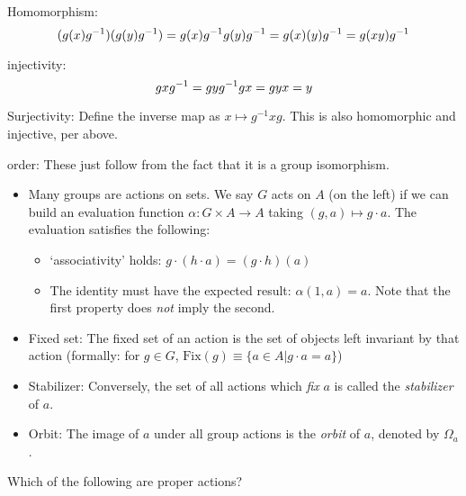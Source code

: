 \documentclass[1    0pt, answers]{exam} \renewcommand{\baselinestretch}{1.05}
\theoremstyle{plain}
\theoremstyle{definition}
\begin{document}
\begin{questions}
\begin{solution}
Homomorphism:
\[
(g (x) g^{-1}) (g (y) g^{-1})\\
= g (x) g^{-1} g (y) g^{-1}\\
= g (x) (y) g^{-1}\\
= g (xy) g^{-1}
\]

injectivity:
\[
g x g^{-1} = g y g^{-1}\\
g x = g y\\
x = y
\]

Surjectivity:
Define the inverse map as $x \mapsto g^{-1} x g$.
This is also homomorphic and injective, per above.

order:
These just follow from the fact that it is a group isomorphism.
\end{solution}

\begin{itemize}
\item Many groups are actions on sets. We say $G$ acts on $A$ (on the left) if we can build an evaluation function $\alpha: G \times A \to A$ taking $(g, a) \mapsto g \cdot a$. The evaluation satisfies the following:
\begin{itemize}
    \item `associativity' holds: $g \cdot (h \cdot a) = (g \cdot h)(a)$
    \item The identity must have the expected result: $\alpha(1, a) = a$. Note that the first property does \emph{not} imply the second.
\end{itemize}
\item Fixed set: The fixed set of an action is the set of objects left invariant by that action (formally: for $g \in G$, $\text{Fix}(g) \equiv \{ a \in A | g \cdot a = a \}$)
\item Stabilizer: Conversely, the set of all actions which \emph{fix} $a$ is called the \emph{stabilizer} of $a$.
\item Orbit: The image of $a$ under all group actions is the \emph{orbit} of $a$, denoted by $\Omega_a$.
\end{itemize}

\question Which of the following are proper actions?
\end{questions}
\end{document}
